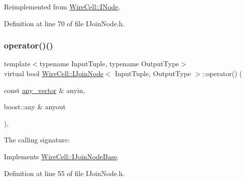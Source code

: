 Reimplemented from \hyperlink{class_wire_cell_1_1_i_node_ae13fc140c8e815fac9327dfa5b43f853}{Wire\+Cell\+::\+I\+Node}.



Definition at line 70 of file I\+Join\+Node.\+h.

\mbox{\label{class_wire_cell_1_1_i_join_node_ab807b2f2f3abbfedc1c1292f8a9cd617}} 
\subsubsection{\texorpdfstring{operator()()}{operator()()}\hspace{0.1cm}{\footnotesize\ttfamily [1/2]}}
{\footnotesize\ttfamily template$<$typename Input\+Tuple, typename Output\+Type$>$ \\
virtual bool \hyperlink{class_wire_cell_1_1_i_join_node}{Wire\+Cell\+::\+I\+Join\+Node}$<$ Input\+Tuple, Output\+Type $>$\+::operator() (\begin{DoxyParamCaption}\item[{const \hyperlink{class_wire_cell_1_1_i_join_node_base_a5d53e0f00c30b472677c399c7d358fa3}{any\+\_\+vector} \&}]{anyin,  }\item[{boost\+::any \&}]{anyout }\end{DoxyParamCaption})\hspace{0.3cm}{\ttfamily [inline]}, {\ttfamily [virtual]}}



The calling signature\+: 



Implements \hyperlink{class_wire_cell_1_1_i_join_node_base_a8d90a969ef56dbb0731e70b05a9d06f8}{Wire\+Cell\+::\+I\+Join\+Node\+Base}.



Definition at line 55 of file I\+Join\+Node.\+h.

\mbox{\label{class_wire_cell_1_1_i_join_node_aef2cc0875f30a08b19b0478c48c190cc}} 
